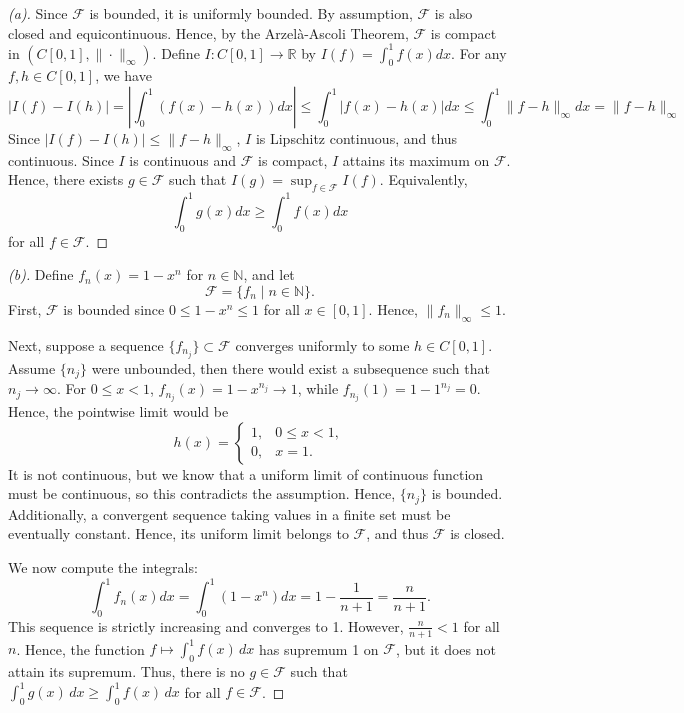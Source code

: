 \begin{proof}[(a)]

    Since $\mathcal{F}$ is bounded, it is uniformly bounded. By assumption, $\mathcal{F}$ is also closed and equicontinuous. Hence, by the Arzelà-Ascoli Theorem, $\mathcal{F}$ is compact in $(C[0,1], \|\cdot\|_\infty)$. Define $I: C[0,1] \to \mathbb{R}$ by $I(f) = \int_0^1 f(x) dx$. For any $f, h \in C[0,1]$, we have
    \[
    |I(f) - I(h)| = \left| \int_0^1 (f(x) - h(x)) dx \right| \le \int_0^1 |f(x) - h(x)| dx \le \int_0^1 \|f - h\|_\infty dx = \|f - h\|_\infty
    \]
    Since $|I(f) - I(h)| \le \|f - h\|_\infty$, $I$ is Lipschitz continuous, and thus continuous. Since $I$ is continuous and $\mathcal{F}$ is compact, $I$ attains its maximum on $\mathcal{F}$. Hence, there exists $g \in \mathcal{F}$ such that $I(g) = \sup_{f \in \mathcal{F}} I(f)$. Equivalently,
    \[
    \int_0^1 g(x) dx \ge \int_0^1 f(x) dx
    \]
    for all $f \in \mathcal{F}$.
    
\end{proof}

\begin{proof}[(b)]

    Define $f_n(x) = 1 - x^n$ for $n \in \mathbb{N}$, and let
    \[
    \mathcal{F} = \{f_n \mid n \in \mathbb{N}\}.
    \]
    First, $\mathcal{F}$ is bounded since $0 \le 1 - x^n \le 1$ for all $x \in [0,1]$. Hence, $\|f_n\|_\infty \le 1$.

    Next, suppose a sequence $\{f_{n_j}\} \subset \mathcal{F}$ converges uniformly to some $h \in C[0,1]$. Assume $\{n_j\}$ were unbounded, then there would exist a subsequence such that $n_j \to \infty$. For $0 \le x < 1$, $f_{n_j}(x) = 1 - x^{n_j} \to 1$, while $f_{n_j}(1) = 1 - 1^{n_j}=0$. Hence, the pointwise limit would be
    \[
    h(x)=
    \begin{cases}
    1, & 0 \le x < 1, \\
    0, & x = 1.
    \end{cases}
    \]
    It is not continuous, but we know that a uniform limit of continuous function must be continuous, so this contradicts the assumption. Hence, $\{n_j\}$ is bounded. Additionally, a convergent sequence taking values in a finite set must be eventually constant. Hence, its uniform limit belongs to $\mathcal{F}$, and thus $\mathcal{F}$ is closed.

    We now compute the integrals:
    \[
    \int_0^1 f_n(x) dx = \int_0^1 (1 - x^n) dx = 1 - \frac{1}{n+1} = \frac{n}{n+1}.
    \]
    This sequence is strictly increasing and converges to 1. However, $\frac{n}{n+1} < 1$  for all $n$. Hence, the function $f \mapsto \int_0^1 f(x)\,dx$ has supremum 1 on $\mathcal{F}$, but it does not attain its supremum. Thus, there is no $g \in \mathcal{F}$ such that $\int_0^1 g(x)\,dx \ge \int_0^1 f(x)\,dx$ for all $f \in \mathcal{F}$.
    
\end{proof}

